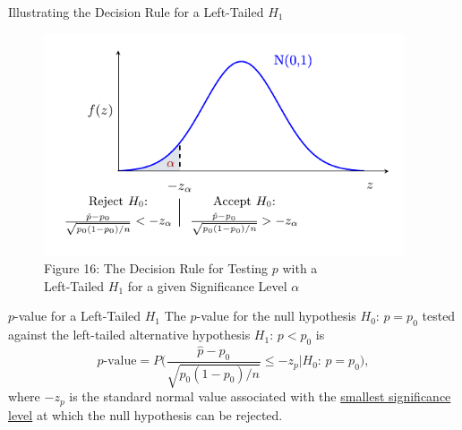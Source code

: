 \documentclass[pdf]{beamer}
\theoremstyle{remark}
\theoremstyle{definition}
\begin{document}
\begin{frame}[t]{Illustrating the Decision Rule for a Left-Tailed $H_1$ }
\begin{figure}[htbp]
    \centering
    \captionsetup{justification=centering}
    \includegraphics[clip, trim=0.5cm 0.5cm 0.0cm 0cm, width=0.95\textwidth]{Hypothesis_Testing_Module_9_pZ2.pdf}  
    \caption{Figure {\color{franklinblue} 16}: The Decision Rule for Testing $p$ with a \\ Left-Tailed $H_1$ for a given Significance Level $\alpha$}
    \label{fig:gauss8}
\end{figure}
\end{frame}

\begin{frame}[t]{$p$-value for a Left-Tailed $H_1$}
The $p$-value for the null hypothesis $H_0\text{: }  p = p_0$ tested against the left-tailed alternative hypothesis $H_1\text{: }  p < p_0$ is
\begin{equation}
p\text{-value} = P\bigg( \frac{\hat{p} - p_0}{\sqrt{p_0(1-p_0)/ n}} \leq -z_{p} | H_0\text{: }  p = p_0 \bigg),
\end{equation}
where $-z_p$ is the standard normal value associated with the \underline{smallest significance level} at which the null hypothesis can be rejected.
\end{frame}
\end{document}
